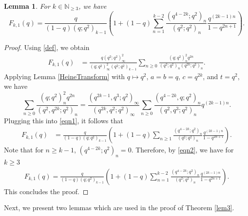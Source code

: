 \documentclass[12pt,reqno]{amsart}
\renewcommand{\(}{\left\(}
\renewcommand{\)}{\right\)}
\numberwithin{equation}{section}
\theoremstyle{plain}
\newtheorem{lemma}[theorem]{Lemma}
\theoremstyle{definition}
\numberwithin{equation}{section}
\begin{document}
\begin{lemma}\label{newlem1}
	For $k\in \mathbb{N}_{\ge 3}$, we have
	\[
	F_{k,1}(q)=\frac{q}{\left(1-q\right)\left(q;q^2\right)_{k-1}}\left(1+\left(1-q\right)\sum_{n=1 }^{k-2}\frac{\left(q^{4-2k};q^2\right)_n}{\left(q^2;q^2\right)_n}\frac{q^{(2k-1)n}}{1-q^{2n+1}}\right).
	\]	
\end{lemma}
\begin{proof}
	Using \eqref{def}, we obtain 
	\begin{align}\label{eqn1}
	F_{k,1}(q)
	&=\frac{q\left(q^2;q^2\right)^2_{\infty}}{\left(q;q^2\right)^2_{\infty}\left(q^2;q^2\right)_{k-1}}\sum_{n\ge 0}\frac{\left(q;q^2\right)^2_nq^{2n}}{\left(q^2;q^2\right)_n\left(q^{2k};q^2\right)_{n}}.
	\end{align}
	Applying Lemma \ref{HeineTransform} with $q\mapsto q^2$, $a=b=q$, $c=q^{2k}$, and $t=q^2$, we have
	\begin{equation*}
	\sum_{n\ge 0}\frac{\left(q;q^2\right)^2_nq^{2n}}{\left(q^2,q^{2k};q^2\right)_{n}}=\frac{\left(q^{2k-1},q^3;q^2\right)_{\infty}}{\left(q^{2k},q^2;q^2\right)_{\infty}}\sum_{n\ge 0}\frac{\left(q^{4-2k},q;q^2\right)_n}{\left(q^2,q^3;q^2\right)_n}q^{(2k-1)n}.
	\end{equation*}
	Plugging this into \eqref{eqn1}, it follows that 
	\begin{align}\label{eqn2}
	F_{k,1}(q)
	&\!=\frac{q}{\left(1-q\right)\left(q;q^2\right)_{k-1}}\left(1+\left(1-q\right)\sum_{n\ge 1}\frac{\left(q^{4-2k};q^2\right)_n}{\left(q^2;q^2\right)_n}\frac{q^{(2k-1)n}}{1-q^{2n+1}}\right).
	\end{align}
	Note that for $n\ge k-1$, $(q^{4-2k};q^2)_n=
	0$. Therefore, by \eqref{eqn2}, we have for $k\ge 3$
	\begin{align*}%
	F_{k,1}(q)=\frac{q}{\left(1-q\right)\left(q;q^2\right)_{k-1}}\left(1+\left(1-q\right)\sum_{n=1 }^{k-2}\frac{\left(q^{4-2k};q^2\right)_n}{\left(q^2;q^2\right)_n}\frac{q^{(2k-1)n}}{1-q^{2n+1}}\right).
	\end{align*}
	This concludes the proof.
\end{proof}



Next, we present two lemmas which are used in the proof of Theorem \ref{lem3}. 
\end{document}
